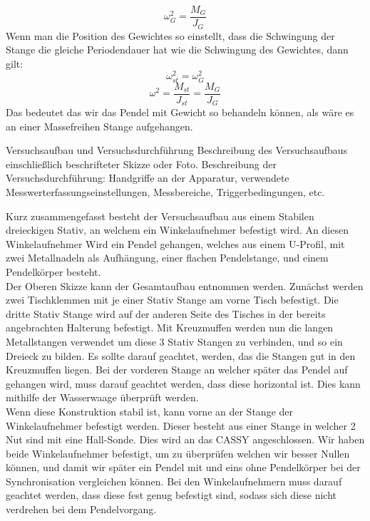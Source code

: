 \documentclass[twoside]{protokoll}
\begin{document}
\begin{equation}
    \omega_{G}^2 = \frac{M_G}{J_G}
\end{equation}
Wenn man die Position des Gewichtes so einstellt, dass die Schwingung der Stange die gleiche Periodendauer hat wie die Schwingung des Gewichtes, dann gilt:
\begin{equation}
    \omega_{st}^2 = \omega_{G}^2
\end{equation}
\begin{equation}
    \omega^2 = \frac{M_{st}}{J_{st}} = \frac{M_G}{J_G}
\end{equation}
Das bedeutet das wir das Pendel mit Gewicht so behandeln können, als wäre es an einer Massefreihen Stange aufgehangen.




\begin{aufgabe}{Versuchsaufbau und Versuchsdurchführung}
  Beschreibung des Versuchsaufbaus einschließlich beschrifteter Skizze
  oder Foto. Beschreibung der Versuchsdurchführung: Handgriffe an der
  Apparatur, verwendete Messwerterfassungseinstellungen, Messbereiche,
  Triggerbedingungen, etc.
\end{aufgabe}

Kurz zusammengefasst besteht der Versuchsaufbau aus einem Stabilen dreieckigen Stativ, an welchem ein Winkelaufnehmer befestigt wird.
An diesen Winkelaufnehmer Wird ein Pendel gehangen, welches aus einem U-Profil, mit zwei Metallnadeln als Aufhängung, einer flachen Pendelstange, und einem Pendelkörper besteht.\\


Der Oberen Skizze kann der Gesamtaufbau entnommen werden. 
Zunächst werden zwei Tischklemmen mit je einer Stativ Stange am vorne Tisch befestigt.
Die dritte Stativ Stange wird auf der anderen Seite des Tisches in der bereits angebrachten Halterung befestigt. 
Mit Kreuzmuffen werden nun die langen Metallstangen verwendet um diese 3 Stativ Stangen zu verbinden, und so ein Dreieck zu bilden.
Es sollte darauf geachtet, werden, das die Stangen gut in den Kreuzmuffen liegen. 
Bei der vorderen Stange an welcher später das Pendel auf gehangen wird, muss darauf geachtet werden, dass diese horizontal ist.
Dies kann mithilfe der Wasserwaage überprüft werden.\\

Wenn diese Konstruktion stabil ist, kann vorne an der Stange der Winkelaufnehmer befestigt werden. 
Dieser besteht aus einer Stange in welcher 2 Nut sind mit eine Hall-Sonde. 
Dies wird an das CASSY angeschlossen.
Wir haben beide Winkelaufnehmer befestigt, um zu überprüfen welchen wir besser Nullen können, und damit wir später ein Pendel mit und eins ohne Pendelkörper bei der Synchronisation vergleichen können.
Bei den Winkelaufnehmern muss darauf geachtet werden, dass diese fest genug befestigt sind, sodass sich diese nicht verdrehen bei dem Pendelvorgang.\\
\end{document}

